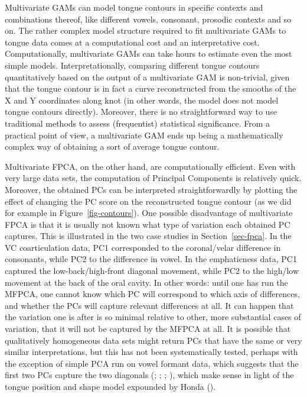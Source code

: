 \documentclass[
  man,
  longtable,
  nolmodern,
  notxfonts,
  notimes,
  colorlinks=true,linkcolor=blue,citecolor=blue,urlcolor=blue]{apa7}
\begin{document}
Multivariate GAMs can model tongue contours in specific contexts and
combinations thereof, like different vowels, consonant, prosodic
contexts and so on. The rather complex model structure required to fit
multivariate GAMs to tongue data comes at a computational cost and an
interpretative cost. Computationally, multivariate GAMs can take hours
to estimate even the most simple models. Interpretationally, comparing
different tongue contours quantitatively based on the output of a
multivariate GAM is non-trivial, given that the tongue contour is in
fact a curve reconstructed from the smooths of the X and Y coordinates
along knot (in other words, the model does not model tongue contours
directly). Moreover, there is no straightforward way to use traditional
methods to assess (frequentist) statistical significance. From a
practical point of view, a multivariate GAM ends up being a
mathematically complex way of obtaining a sort of average tongue
contour.

Multivariate FPCA, on the other hand, are computationally efficient.
Even with very large data sets, the computation of Principal Components
is relatively quick. Moreover, the obtained PCs can be interpreted
straightforwardly by plotting the effect of changing the PC score on the
reconstructed tongue contour (as we did for example in
Figure~\ref{fig-contours}). One possible disadvantage of multivariate
FPCA is that it is usually not known what type of variation each
obtained PC captures. This is illustrated in the two case studies in
Section~\ref{sec-fpca}. In the VC coarticulation data, PC1 corresponded
to the coronal/velar difference in consonants, while PC2 to the
difference in vowel. In the emphaticness data, PC1 captured the
low-back/high-front diagonal movement, while PC2 to the high/low
movement at the back of the oral cavity. In other words: until one has
run the MFPCA, one cannot know which PC will correspond to which axis of
differences, and whether the PCs will capture relevant differences at
all. It can happen that the variation one is after is so minimal
relative to other, more substantial cases of variation, that it will not
be captured by the MFPCA at all. It is possible that qualitatively
homogeneous data sets might return PCs that have the same or very
similar interpretations, but this has not been systematically tested,
perhaps with the exception of simple PCA run on vowel formant data,
which suggests that the first two PCs capture the two diagonals
(;
;
;
), which make
sense in light of the tongue position and shape model expounded by Honda
().
\end{document}
